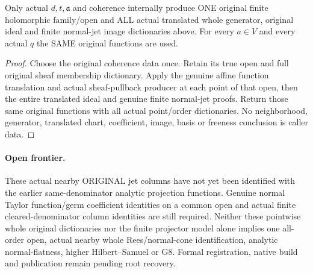 \begin{theorem}
\label{hir:relative-normal-translated-jets-original-coherent-consumer}
\leanok
{}
Only actual $d,t,\mathfrak a$ and coherence internally produce ONE original
finite holomorphic family/open and ALL actual translated whole generator,
original ideal and finite normal-jet image dictionaries above. For every
$a\in V$ and every actual $q$ the SAME original functions are used.
\end{theorem}
\begin{proof}
Choose the original coherence data once. Retain its true open and full
original sheaf membership dictionary. Apply the genuine affine function
translation and actual sheaf-pullback producer at each point of that open,
then the entire translated ideal and genuine finite normal-jet proofs. Return
those same original functions with all actual point/order dictionaries.
No neighborhood, generator, translated chart, coefficient, image, basis or
freeness conclusion is caller data.
\end{proof}

\paragraph{Open frontier.}
These actual nearby ORIGINAL jet columns have not yet been identified with
the earlier same-denominator analytic projection functions. Genuine normal
Taylor function/germ coefficient identities on a common open and actual
finite cleared-denominator column identities are still required. Neither
these pointwise whole original dictionaries nor the finite projector model
alone implies one all-order open, actual nearby whole Rees/normal-cone
identification, analytic normal-flatness, higher Hilbert--Samuel or G8.
Formal registration, native build and publication remain pending root recovery.
